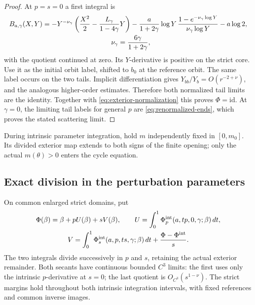 \begin{proof}
At \(p=s=0\) a first integral is
\begin{equation}\label{ann:gamma-first-integral}
\begin{split}
 B_{a,\gamma}(X,Y)
 &=-Y^{-\nu_\gamma}
       \left(\frac{X^2}{2}-\frac{L_\gamma}{1-4\gamma}Y\right)
       -\frac{a}{1+2\gamma}\log Y\,
          \frac{1-e^{-\nu_\gamma\log Y}}{\nu_\gamma\log Y}
       -a\log2,\\
 &\hspace{35mm}\nu_\gamma=\frac{6\gamma}{1+2\gamma},
\end{split}
\end{equation}
with the quotient continued at zero. Its \(Y\)-derivative is positive
on the strict core. Use it as the initial orbit label, shifted to \(b_0\)
at the reference orbit. The same label occurs on the two tails.
Implicit differentiation gives \(Y_{bb}/Y_b=O(r^{-2+\nu})\),
and the analogous higher-order estimates. Therefore both normalized
tail limits are the identity. Together with
\eqref{eq:exterior-normalization} this proves \(\Phi=\mathrm{id}\).
At \(\gamma=0\), the limiting tail labels for general \(p\) are
\eqref{eq:renormalized-ends}, which proves the stated scattering limit.
\end{proof}

During intrinsic parameter integration, hold \(m\) independently
fixed in \([0,m_0]\). Its divided exterior map extends to both signs
of the finite opening; only the actual \(m(\theta)>0\) enters the
cycle equation.

\subsection{Exact division in the perturbation parameters}

On common enlarged strict domains, put
\begin{equation}\label{ann:exact-source-division}
 \begin{gathered}
 \Phi(\beta)=\beta+pU(\beta)+sV(\beta),\qquad
 U=\int_0^1\Phi_p^{\rm int}(a,tp,0,\gamma;\beta)\,dt,\\
 V=\int_0^1\Phi_s^{\rm int}(a,p,ts,\gamma;\beta)\,dt
          +\frac{\Phi-\Phi^{\rm int}}s .
 \end{gathered}
\end{equation}
The two integrals divide successively in \(p\) and \(s\), retaining
the actual exterior remainder. Both secants have continuous bounded
\(C^3\) limits: the first uses only the intrinsic
\(p\)-derivative at \(s=0\); the last quotient is
\(O_{C^3}(s^{1-\nu})\). The strict margins hold throughout both
intrinsic integration intervals, with fixed references and common
inverse images.


